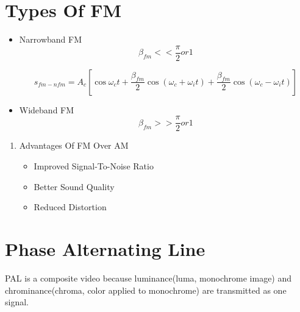 \documentclass[11pt]{report}
\begin{document}
\section{Types Of FM}
\label{sec:org65d600b}
\begin{itemize}
\item Narrowband FM
$$\beta_{fm} << \frac{\pi}{2} or 1$$

$$s_{fm-nfm} = A_c [\cos{\omega_c t} + \frac{\beta_{fm}}{2}\cos(\omega_c+ \omega_{i} t)+ \frac{\beta_{fm}}{2}\cos(\omega_c - \omega_{i} t)]$$
\item Wideband FM
$$\beta_{fm} >> \frac{\pi}{2} or 1$$
\end{itemize}
\begin{enumerate}
\item Advantages Of FM Over AM
\label{sec:org012a1a2}
\begin{itemize}
\item Improved Signal-To-Noise Ratio
\item Better Sound Quality
\item Reduced Distortion
\end{itemize}
\end{enumerate}
\section{Phase Alternating Line}
\label{sec:orgf927207}
PAL is a composite video because luminance(luma, monochrome image) and chrominance(chroma, color applied to monochrome) are transmitted as one signal.
\end{document}
